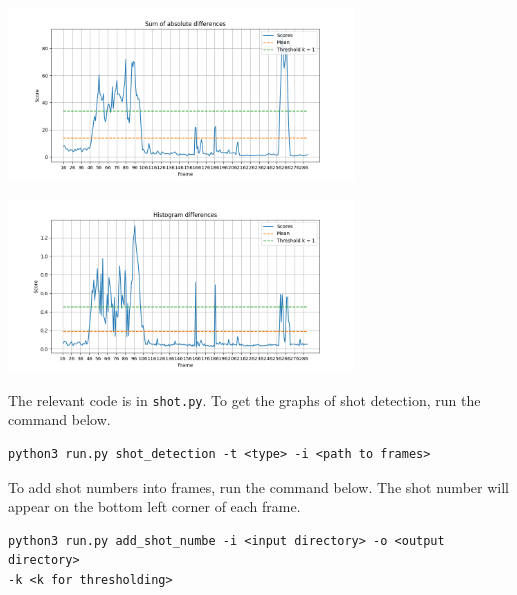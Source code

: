 \documentclass{article}
\begin{document}
\begin{minipage}{0.5\linewidth}
 \label{fig: clip_3_sad2}
\centering
\includegraphics[width=3.6in]{../output/clip_3_score_sad2.png}
\end{minipage}%
\begin{minipage}{0.5\linewidth}
 \label{fig: clip_3_hd}
\centering
\includegraphics[width=3.6in]{../output/clip_3_score_hd.png}
\end{minipage}
\vspace*{10pt}

The relevant code is in \texttt{shot.py}. To get the graphs of shot detection, run the command below. 
\begin{verbatim}
python3 run.py shot_detection -t <type> -i <path to frames>
\end{verbatim}

To add shot numbers into frames, run the command below. The shot number will appear on the bottom left corner of each frame.
\begin{verbatim}
python3 run.py add_shot_numbe -i <input directory> -o <output directory> 
-k <k for thresholding>
\end{verbatim}
\end{document}
